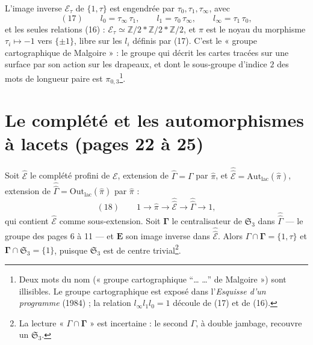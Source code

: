 \documentclass[11pt,a4paper]{article}
\begin{document}
L'image inverse $\mathcal{E}_\tau$ de $\{1, \tau\}$ est engendrée par $\tau_0,
\tau_1, \tau_\infty$, avec
\[
(17)\qquad l_0 = \tau_\infty\,\tau_1, \qquad l_1 = \tau_0\,\tau_\infty, \qquad
l_\infty = \tau_1\,\tau_0,
\]
et les seules relations (16) : $\mathcal{E}_\tau \simeq \mathbb{Z}/2 *
\mathbb{Z}/2 * \mathbb{Z}/2$, et $\pi$ est le noyau du morphisme $\tau_i \mapsto
-1$ vers $\{\pm 1\}$, libre sur les $l_i$ définis par (17). C'est le
« groupe cartographique de Malgoire » : le groupe qui décrit les cartes tracées
sur une surface par son action sur les drapeaux, et dont le sous-groupe
d'indice $2$ des mots de longueur paire est $\pi_{0,3}$\footnote{Deux mots du
nom (« groupe cartographique “\ldots{} \ldots” de Malgoire ») sont illisibles.
Le groupe cartographique est exposé dans l'\emph{Esquisse d'un programme}
(1984) ; la relation $l_\infty l_1 l_0 = 1$ découle de (17) et de (16).}.

\section*{Le complété et les automorphismes à lacets (pages 22 à 25)}

Soit $\widehat{\mathcal{E}}$ le complété profini de $\mathcal{E}$, extension de
$\widehat{\Gamma} = \Gamma$ par $\widehat{\pi}$, et $\hat{\hat{\mathcal{E}}} =
\mathrm{Aut}_{\mathrm{lac}}(\widehat{\pi})$, extension de $\hat{\hat\Gamma} =
\mathrm{Out}_{\mathrm{lac}}(\widehat{\pi})$ par $\widehat{\pi}$ :
\[
(18)\qquad 1 \longrightarrow \widehat{\pi} \longrightarrow
\hat{\hat{\mathcal{E}}} \longrightarrow \hat{\hat\Gamma} \longrightarrow 1,
\]
qui contient $\widehat{\mathcal{E}}$ comme sous-extension. Soit
$\boldsymbol{\Gamma}$ le centralisateur de $\mathfrak{S}_3$ dans
$\hat{\hat\Gamma}$ — le groupe des pages 6 à 11 — et $\mathbf{E}$ son image
inverse dans $\hat{\hat{\mathcal{E}}}$. Alors $\Gamma \cap \boldsymbol{\Gamma}
= \{1, \tau\}$ et $\boldsymbol{\Gamma} \cap \mathfrak{S}_3 = \{1\}$, puisque
$\mathfrak{S}_3$ est de centre trivial\footnote{La lecture « $\Gamma \cap
\boldsymbol{\Gamma}$ » est incertaine : le second $\Gamma$, à double jambage,
recouvre un $\mathfrak{S}_3$.}.
\end{document}
